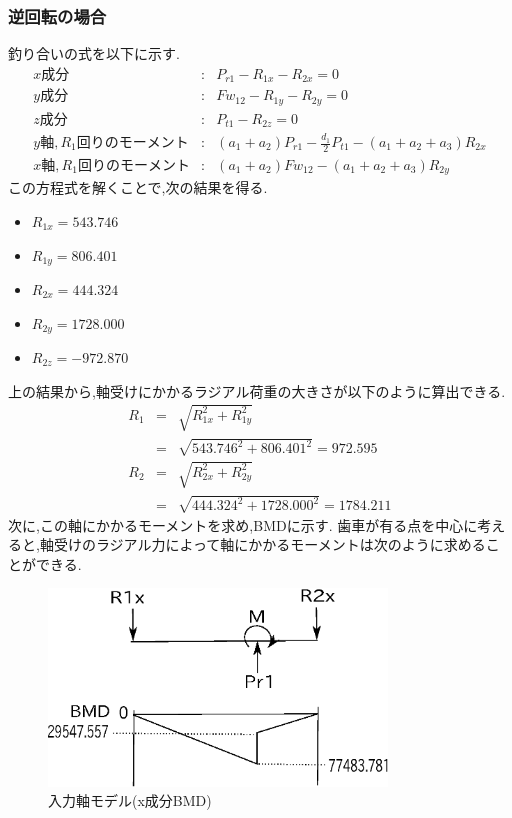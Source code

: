 \documentclass[a4j,twoside,openright,11pt]{jreport}
\begin{document}
\subsubsection{逆回転の場合}
釣り合いの式を以下に示す.
\begin{eqnarray}
x成分&:&P_{r1}-R_{1x}-R_{2x}=0\\
y成分&:&Fw_{12}-R_{1y}-R_{2y}=0\\
z成分&:&P_{t1}-R_{2z}=0\\
y軸,R_1回りのモーメント&:&(a_1+a_2)P_{r1}-\frac{d_1}{2}P_{t1}-(a_1+a_2+a_3)R_{2x}\\
x軸,R_1回りのモーメント&:&(a_1+a_2)Fw_{12}-(a_1+a_2+a_3)R_{2y}
\end{eqnarray}
この方程式を解くことで,次の結果を得る.
\begin{itemize}
\item $R_{1x}=543.746$
\item $R_{1y}=806.401$
\item $R_{2x}=444.324$
\item $R_{2y}=1728.000$
\item $R_{2z}=-972.870$
\end{itemize}
上の結果から,軸受けにかかるラジアル荷重の大きさが以下のように算出できる.
\begin{eqnarray}
R_1 &=& \sqrt {R_{1x}^2+R_{1y}^2}\\
    &=& \sqrt {543.746^2+806.401^2}=972.595\\
R_2 &=& \sqrt {R_{2x}^2+R_{2y}^2}\\
    &=& \sqrt {444.324^2+1728.000^2}=1784.211
\end{eqnarray}
次に,この軸にかかるモーメントを求め,BMDに示す.
歯車が有る点を中心に考えると,軸受けのラジアル力によって軸にかかるモーメントは次のように求めることができる.
\begin{figure}[htbp]
\begin{center}
\includegraphics[width=9cm]{jiku142.eps}
\end{center}
\caption{入力軸モデル(x成分BMD)}
\end{figure}
\end{document}
